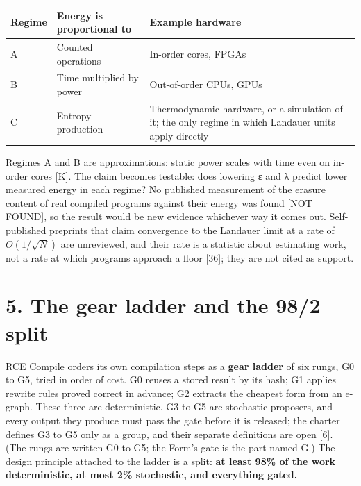 \documentclass[10pt,letterpaper]{article}
\begin{document}
{\footnotesize\setlength{\tabcolsep}{3.8pt}\renewcommand{\arraystretch}{1.15}
\begin{longtable}[]{@{}
  >{\raggedright\arraybackslash}p{}
  >{\raggedright\arraybackslash}p{}
  >{\raggedright\arraybackslash}p{}@{}}
\toprule\noalign{}
\begin{minipage}[b]{\linewidth}\raggedright
\textbf{Regime}
\end{minipage} & \begin{minipage}[b]{\linewidth}\raggedright
\textbf{Energy is proportional to}
\end{minipage} & \begin{minipage}[b]{\linewidth}\raggedright
\textbf{Example hardware}
\end{minipage} \\
\midrule\noalign{}
\endhead
\bottomrule\noalign{}
\endlastfoot
A & Counted operations & In-order cores, FPGAs \\
B & Time multiplied by power & Out-of-order CPUs, GPUs \\
C & Entropy production & Thermodynamic hardware, or a simulation of it;
the only regime in which Landauer units apply directly \\
\end{longtable}
}

Regimes A and B are approximations: static power scales with time even
on in-order cores {[}K{]}. The claim becomes testable: does lowering ε
and λ predict lower measured energy in each regime? No published
measurement of the erasure content of real compiled programs against
their energy was found {[}NOT FOUND{]}, so the result would be new
evidence whichever way it comes out. Self-published preprints that claim
convergence to the Landauer limit at a rate of \(O(1/\sqrt{N})\) are
unreviewed, and their rate is a statistic about estimating work, not a
rate at which programs approach a floor {[}36{]}; they are not cited as
support.

\section{5. The gear ladder and the 98/2
split}\label{the-gear-ladder-and-the-982-split}

RCE Compile orders its own compilation steps as a \textbf{gear ladder}
of six rungs, G0 to G5, tried in order of cost. G0 reuses a stored
result by its hash; G1 applies rewrite rules proved correct in advance;
G2 extracts the cheapest form from an e-graph. These three are
deterministic. G3 to G5 are stochastic proposers, and every output they
produce must pass the gate before it is released; the charter defines G3
to G5 only as a group, and their separate definitions are open {[}6{]}.
(The rungs are written G0 to G5; the Form's gate is the part named G.)
The design principle attached to the ladder is a split: \textbf{at least
98\% of the work deterministic, at most 2\% stochastic, and everything
gated.}
\end{document}
